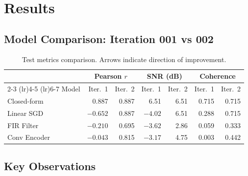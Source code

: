 \documentclass[11pt,a4paper]{article}
\begin{document}
\section{Results}

\subsection{Model Comparison: Iteration 001 vs 002}

\begin{table}[H]
\centering
\caption{Test metrics comparison. Arrows indicate direction of improvement.}
\label{tab:comparison}
\begin{tabular}{lrrrrrr}
\toprule
& \multicolumn{2}{c}{Pearson $r$} & \multicolumn{2}{c}{SNR (dB)} & \multicolumn{2}{c}{Coherence} \\
\cmidrule(lr){2-3} \cmidrule(lr){4-5} \cmidrule(lr){6-7}
Model & Iter.~1 & Iter.~2 & Iter.~1 & Iter.~2 & Iter.~1 & Iter.~2 \\
\midrule
Closed-form & 0.887 & 0.887 & 6.51 & 6.51 & 0.715 & 0.715 \\
Linear SGD & \textcolor{bad}{$-0.652$} & \textcolor{good}{0.887} & $-4.02$ & \textcolor{good}{6.51} & 0.288 & \textcolor{good}{0.715} \\
FIR Filter & \textcolor{bad}{$-0.210$} & \textcolor{improved}{0.695} & $-3.62$ & \textcolor{improved}{2.86} & 0.059 & \textcolor{improved}{0.333} \\
Conv Encoder & \textcolor{bad}{$-0.043$} & \textcolor{improved}{0.815} & $-3.17$ & \textcolor{improved}{4.75} & 0.003 & \textcolor{improved}{0.442} \\
\bottomrule
\end{tabular}
\end{table}

\subsection{Key Observations}
\end{document}

